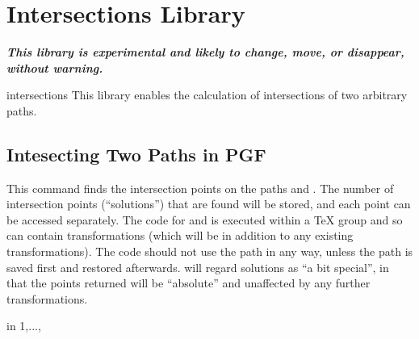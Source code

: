 %
%
%


\section{Intersections Library}

{\bf\emph{This library is experimental and likely to change,
move, or disappear, without warning.}}

\begin{pgflibrary}{intersections}
  This library enables the calculation of intersections of
  two arbitrary paths.
\end{pgflibrary}

\subsection{Intesecting Two Paths in PGF}

\begin{command}{\pgfintersectionofpaths{}}
  This command finds the intersection points on the paths 
   and . The number of intersection points
  (``solutions'') that are found will be stored, and each point 
  can be accessed separately. The code for  and 
   is executed within a \TeX{} group and so can contain
  transformations (which will be in addition to any existing
  transformations). The code should not use the path in any way, 
  unless the path is saved first and restored afterwards.
  \pgfname{} will regard solutions as ``a bit
  special'', in that the points returned  will be ``absolute'' and 
  unaffected by any further transformations.

\begin{codeexample}[]
\begin{pgfpicture}
\pgfintersectionofpaths
{
  \pgfgetpath\temppath
  \pgfsetpath\temppath
}
{
  \pgfgetpath\temppath
  \pgfsetpath\temppath
}
\foreach \s in {1,...,\pgfintersectionsolutions}
  {\pgfpathcircle{\pgfpointintersectionsolution{\s}}{2pt}}
\end{pgfpicture}
\end{codeexample}

\end{command}

